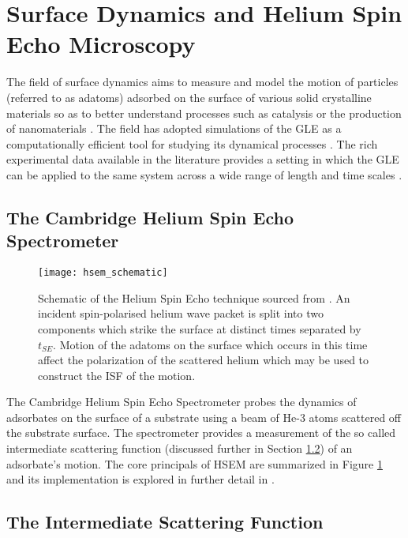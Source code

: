 \section{Surface Dynamics and Helium Spin Echo Microscopy}

The field of surface dynamics aims to measure and model the motion of particles (referred to as adatoms) adsorbed on the surface of various solid crystalline materials so as to better understand processes such as catalysis or the production of nanomaterials \cite{B810769F}. The field has adopted simulations of the GLE as a computationally efficient tool for studying its dynamical processes \cite{Ward, Townsend, AVIDOR2019145}. The rich experimental data available in the literature provides a setting in which the GLE can be applied to the same system across a wide range of length and time scales \cite{JARDINE2009323, HSEM}.

\subsection{The Cambridge Helium Spin Echo Spectrometer}

\begin{figure}
	\centering
	\texttt{[image: hsem\_schematic]}
	\caption{Schematic of the Helium Spin Echo technique sourced from \cite{B810769F}. An incident spin-polarised helium wave packet is split into two components which strike the surface at distinct times separated by $t_{SE}$. Motion of the adatoms on the surface which occurs in this time affect the polarization of the scattered helium which may be used to construct the ISF of the motion.}
	\label{fig:hsem}
\end{figure}

The Cambridge Helium Spin Echo Spectrometer probes the dynamics of adsorbates on the surface of a substrate using a beam of He-3 atoms scattered off the substrate surface. The spectrometer provides a measurement of the so called intermediate scattering function (discussed further in Section \ref{sec:isf_intro}) of an adsorbate's motion. The core principals of HSEM are summarized in Figure \ref{fig:hsem} and its implementation is explored in further detail in \cite{Ward, HSEM, JARDINE2009323}.

\subsection{The Intermediate Scattering Function} \label{sec:isf_intro}

